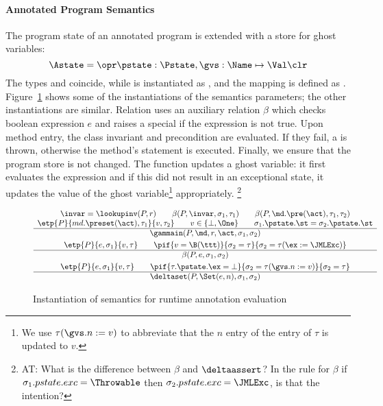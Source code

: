 \paragraph{Annotated Program Semantics}

The program state of an annotated program is extended with a store for
ghost variables:
\[
\Astate = \opr \pstate : \Pstate, \gvs : \Name \mapsto \Val \clr
\]
The types \FullProgram and \Program coincide, while \FullState is
instantiated as \Astate, and the mapping \progstate is defined as
\pstate. Figure~\ref{FigAnnotatedSem} shows some of the
instantiations of the semantics parameters; the other instantiations
are similar. Relation \gammain uses an auxiliary relation \(\beta\)
which checks boolean expression \(e\) and raises a special \JMLExc if
the expression is not true. Upon method entry, the class invariant and
precondition are evaluated. If they fail, a \JMLExc is thrown,
otherwise the method's \preset statement is executed. Finally, we
ensure that the program store is not changed. The function
\deltaset updates a ghost variable: it first evaluates the expression
and if this did not result in an exceptional state, it updates the
value of the ghost variable\footnote{We use \(\tau(\gvs.n := v)\) to
abbreviate that the \(n\) entry of the \gvs entry of \(\tau\) is
updated to \(v\).} appropriately.
\footnote{AT: What is the difference between $\beta$ and $\deltaassert$?
In the rule for $\beta$ if $\sigma_1.pstate.exc = \Throwable$ then
$\sigma_2.pstate.exc = \JMLExc$, is that the intention?}

\begin{figure}[t]
\[
\begin{array}[t]{c}
\invar = \lookupinv(P, r) \qquad
\beta(P, \invar, \sigma_1, \tau_1) \qquad
\beta(P, \md.\pre(\act), \tau_1, \tau_2) \\
\etp{P}{md.\preset(\act), \tau_1}{v,\tau_2} \qquad v\in\{\bot,\One\} \qquad
\sigma_1.\pstate.\st = \sigma_2.\pstate.\st\\
\hline
\gammain(P, \md, r, \act, \sigma_1, \sigma_2)
\smallskip\\


\etp{P}{e, \sigma_1}{v, \tau} \qquad
\pif{v = \B(\ttt)}{\sigma_2 = \tau}{\sigma_2 = \tau (\ex := \JMLExc)}\\
\hline
\beta(P, e, \sigma_1, \sigma_2)

\smallskip\\

\etp{P}{e, \sigma_1}{v, \tau} \qquad
\pif{\tau.\pstate.\ex = \bot}{\sigma_2 = \tau (\gvs.n := v)}{\sigma_2 = \tau}\\
\hline
\deltaset(P, \Set(e, n), \sigma_1, \sigma_2)
\end{array}
\]
\caption{Instantiation of semantics for runtime annotation evaluation}
\label{FigAnnotatedSem}
\end{figure}


